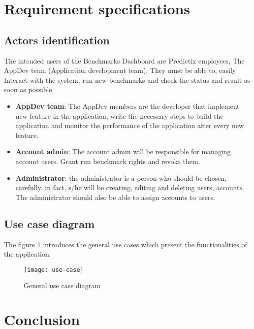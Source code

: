 \section{Requirement specifications}
\subsection{Actors identification}
The intended users of the Benchmarks Dashboard are Predictix employees, The
AppDev team (Application development team). They must be able to, easily
Interact with the system, run new benchmarks and check the status and result as
soon as possible.

\begin{itemize}
  \item{\textbf{AppDev team}}: The AppDev members are the developer that implement new
    feature in the application, write the necessary steps to build the
    application and monitor the performance of the application after every new
    feature.
  \item{\textbf{Account admin}}: The account admin will be responsible for managing
    account users. Grant run benchmark rights and revoke them.
  \item{\textbf{Administrator}}: the administrator is a person who should be chosen,
    carefully. in fact, s/he will be creating, editing and deleting users,
    accounts. The administrator should also be able to assign accounts to users.
\end{itemize}

\subsection{Use case diagram}
The figure \hyperref[fig:use-case]{\ref{fig:use-case}} introduces the general use cases which present the
functionalities of the application.

\begin{figure}[h]
  \center
  \texttt{[image: use-case]}
  \caption{General use case diagram}
\label{fig:use-case}
\end{figure}


\section*{Conclusion}
